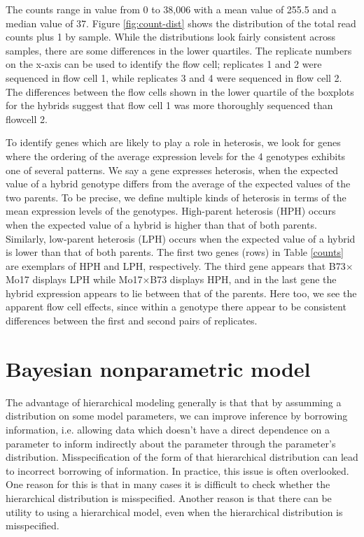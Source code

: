 The counts range in value from 0 to 38,006 with a mean value of 255.5 and a median value of 37. Figure \ref{fig:count-dist} shows the distribution of the total read counts plus 1 by sample. While the distributions look fairly consistent across samples, there are some differences in the lower quartiles. The replicate numbers on the x-axis can be used to identify the flow cell; replicates 1 and 2 were sequenced in flow cell 1, while replicates 3 and 4 were sequenced in flow cell 2. The differences between the flow cells shown in the lower quartile of the boxplots for the hybrids suggest that flow cell 1 was more thoroughly sequenced than flowcell 2.


To identify genes which are likely to play a role in heterosis, we look for genes where the ordering of the average expression levels for the 4 genotypes exhibits one of several patterns. We say a gene expresses heterosis, when the expected value of a hybrid genotype differs from the average of the expected values of the two parents. To be precise, we define multiple kinds of heterosis in terms of the mean expression levels of the genotypes. High-parent heterosis (HPH) occurs when the expected value of a hybrid is higher than that of both parents. Similarly, low-parent heterosis (LPH) occurs when the expected value of a hybrid is lower than that of both parents. The first two genes (rows) in Table \ref{counts} are exemplars of HPH and LPH, respectively. The third gene appears that B73$\times$Mo17 displays LPH while Mo17$\times$B73 displays HPH, and in the last gene the hybrid expression appears to lie between that of the parents. Here too, we see the apparent flow cell effects, since within a genotype there appear to be consistent differences between the first and second pairs of replicates.

\section{Bayesian nonparametric model}
The advantage of hierarchical modeling generally is that that by assumming a distribution on some model parameters, we can improve inference by borrowing information, i.e. allowing data which doesn't have a direct dependence on a parameter to inform indirectly about the parameter through the parameter's distribution. Misspecification of the form of that hierarchical distribution can lead to incorrect borrowing of information. In practice, this issue is often overlooked. One reason for this is that in many cases it is difficult to check whether the hierarchical distribution is misspecified. Another reason is that there can be utility to using a hierarchical model, even when the hierarchical distribution is misspecified.

